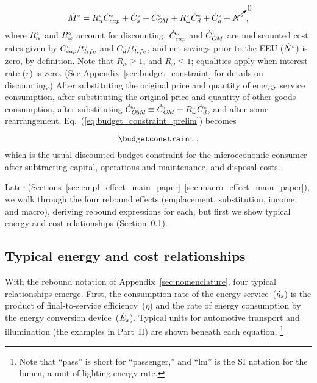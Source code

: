 \documentclass[12pt]{article}\usepackage[]{graphicx}\usepackage[]{xcolor}
\begin{document}
\begin{equation} \label{eq:budget_constraint_prelim}
  {}{\dot{M}}^{\scriptscriptstyle \circ} = {}{R}^{\scriptscriptstyle \circ}_\alpha {}{\dot{C}}^{\scriptscriptstyle \circ}_{cap} + {}{\dot{C}}^{\scriptscriptstyle \circ}_s + {}{\dot{C}}^{\scriptscriptstyle \circ}_{O\!M} + {}{R}^{\scriptscriptstyle \circ}_\omega {}{\dot{C}}^{\scriptscriptstyle \circ}_d + {}{\dot{C}}^{\scriptscriptstyle \circ}_{o} + \cancelto{0}{{}{\dot{N}}^{\scriptscriptstyle \circ}} \; ,
\end{equation}
%
where 
${}{R}^{\scriptscriptstyle \circ}_\alpha$ and ${}{R}^{\scriptscriptstyle \circ}_\omega$ account for discounting, 
${}{\dot{C}}^{\scriptscriptstyle \circ}_{cap}$ and ${}{\dot{C}}^{\scriptscriptstyle \circ}_{O\!M}$ are undiscounted
cost rates given by 
${}{C}^{\scriptscriptstyle \circ}_{cap} / {}{t}^{\scriptscriptstyle \circ}_{life}$ 
and
${}{C}^{\scriptscriptstyle \circ}_d / {}{t}^{\scriptscriptstyle \circ}_{life}$,
and
net savings prior to the EEU (${}{\dot{N}}^{\scriptscriptstyle \circ}$) is zero, by definition.
Note that $R_\alpha \ge 1$, and $R_\omega \le 1$;
equalities apply when interest rate ($r$) is zero.
(See Appendix~\ref{sec:budget_constraint} for details on discounting.)
After substituting the original price and quantity of energy service consumption,
after substituting the original price and quantity of other goods consumption,
after substituting ${}{\dot{C}}^{\scriptscriptstyle \circ}_{O\!M\!d} \equiv {}{\dot{C}}^{\scriptscriptstyle \circ}_{O\!M} + {}{R}^{\scriptscriptstyle \circ}_\omega {}{\dot{C}}^{\scriptscriptstyle \circ}_d$,
and after some rearrangement, 
Eq.~(\ref{eq:budget_constraint_prelim}) becomes

\begin{equation} \label{eq:budget_constraint}
 \budgetconstraint \; ,
\end{equation}
%
which is the usual discounted budget constraint 
for the microeconomic consumer
after subtracting capital, operations and maintenance, and disposal costs.

Later (Sections~\ref{sec:empl_effect_main_paper}--\ref{sec:macro_effect_main_paper}), 
we walk through the four rebound effects
(emplacement, substitution, income, and macro), 
deriving rebound expressions for each, 
but first 
we show typical energy and cost relationships 
(Section~\ref{sec:energy_and_cost_relationships}).


\subsection{Typical energy and cost relationships}
\label{sec:energy_and_cost_relationships}

With the rebound notation of Appendix~\ref{sec:nomenclature}, 
four typical relationships emerge.
First, the consumption rate of the energy service~($\dot{q}_s$)
is the product of final-to-service efficiency~($\eta$) and
the rate of energy consumption by the energy conversion device~($\dot{E}_s$).
Typical units for automotive transport and illumination
(the examples in Part~II) are shown
beneath each equation.%
\footnote{
  Note that ``pass'' is short for ``passenger,'' and
  ``lm'' is the SI notation for the lumen, a unit of lighting energy rate.
}
\end{document}
